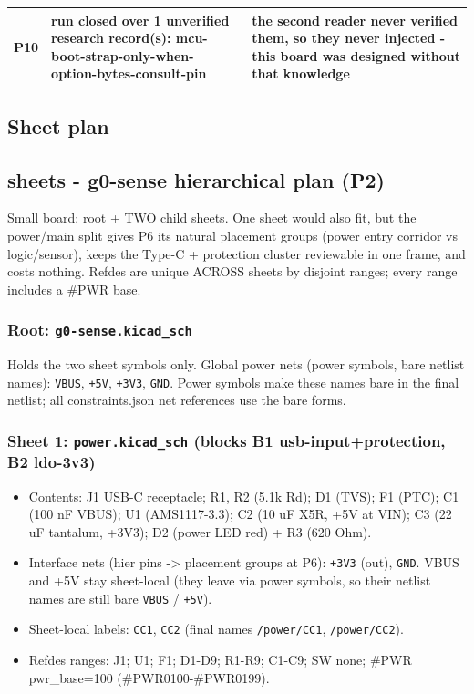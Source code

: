 \documentclass[11pt,a4paper]{article}
\begin{document}
{\begin{longtable}{lp{5.2cm}p{7.2cm}}
P10 & run closed over 1 unverified research record(s): mcu-boot-strap-only-when-option-bytes-consult-pin & the second reader never verified them, so they never injected - this board was designed without that knowledge \\
\bottomrule
\end{longtable}
}
\subsection*{Sheet plan}
\subsection*{sheets - g0-sense hierarchical plan (P2)}
Small board: root + TWO child sheets. One sheet would also fit, but the power/main split gives P6 its natural placement groups (power entry corridor vs logic/sensor), keeps the Type-C + protection cluster reviewable in one frame, and costs nothing. Refdes are unique ACROSS sheets by disjoint ranges; every range includes a \#PWR base.

\subsubsection*{Root: \texttt{g0-sense.kicad\_sch}}
Holds the two sheet symbols only. Global power nets (power symbols, bare netlist names): \texttt{VBUS}, \texttt{+5V}, \texttt{+3V3}, \texttt{GND}. Power symbols make these names bare in the final netlist; all constraints.json net references use the bare forms.

\subsubsection*{Sheet 1: \texttt{power.kicad\_sch} (blocks B1 usb-input+protection, B2 ldo-3v3)}
\begin{itemize}
\item Contents: J1 USB-C receptacle; R1, R2 (5.1k Rd); D1 (TVS); F1 (PTC);
C1 (100 nF VBUS); U1 (AMS1117-3.3); C2 (10 uF X5R, +5V at VIN);
C3 (22 uF tantalum, +3V3); D2 (power LED red) + R3 (620 Ohm).
\item Interface nets (hier pins -\textgreater{} placement groups at P6): \texttt{+3V3} (out),
\texttt{GND}. VBUS and +5V stay sheet-local (they leave via power symbols, so
their netlist names are still bare \texttt{VBUS} / \texttt{+5V}).
\item Sheet-local labels: \texttt{CC1}, \texttt{CC2} (final names \texttt{/power/CC1}, \texttt{/power/CC2}).
\item Refdes ranges: J1; U1; F1; D1-D9; R1-R9; C1-C9; SW none; \#PWR pwr\_base=100
(\#PWR0100-\#PWR0199).
\end{itemize}
\end{document}
